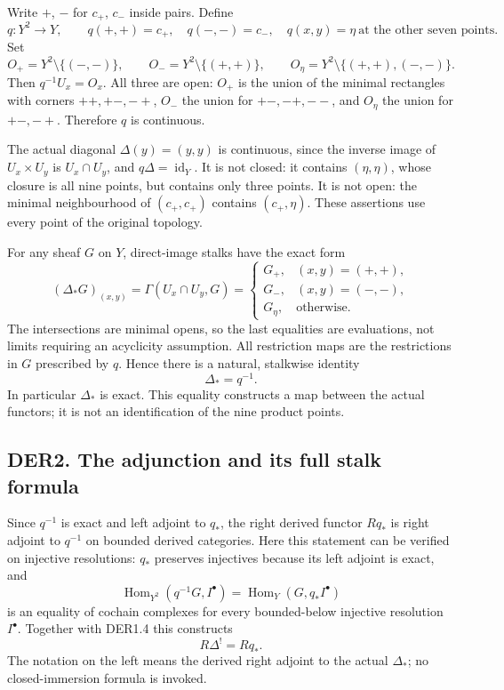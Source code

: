 Write \(+\), \(-\) for \(c_+\), \(c_-\) inside pairs. Define \[
q:Y^2\longrightarrow Y,\qquad
q(+,+)=c_+,\quad q(-,-)=c_-,\quad
q(x,y)=\eta\ \text{at the other seven points}.
\tag{DER1.1}
\] Set \[
O_+=Y^2\setminus\{(-,-)\},\qquad
O_-=Y^2\setminus\{(+,+)\},\qquad
O_\eta=Y^2\setminus\{(+,+),(-,-)\}.
\tag{DER1.2}
\] Then \(q^{-1}U_x=O_x\). All three are open: \(O_+\) is the union of
the minimal rectangles with corners \(++,+-,-+\), \(O_-\) the union for
\(+-,-+,--\), and \(O_\eta\) the union for \(+-,-+\). Therefore \(q\) is
continuous.

The actual diagonal \(\Delta(y)=(y,y)\) is continuous, since the inverse
image of \(U_x\times U_y\) is \(U_x\cap U_y\), and
\(q\Delta=\operatorname{id}_Y\). It is not closed: it contains
\((\eta,\eta)\), whose closure is all nine points, but contains only
three points. It is not open: the minimal neighbourhood of \((c_+,c_+)\)
contains \((c_+,\eta)\). These assertions use every point of the
original topology.

For any sheaf \(G\) on \(Y\), direct-image stalks have the exact form \[
(\Delta_*G)_{(x,y)}
=\Gamma(U_x\cap U_y,G)
=\begin{cases}
G_+,&(x,y)=(+,+),\\
G_-,&(x,y)=(-,-),\\
G_\eta,&\text{otherwise}.
\end{cases}
\tag{DER1.3}
\] The intersections are minimal opens, so the last equalities are
evaluations, not limits requiring an acyclicity assumption. All
restriction maps are the restrictions in \(G\) prescribed by \(q\).
Hence there is a natural, stalkwise identity \[
\boxed{\Delta_*=q^{-1}.}
\tag{DER1.4}
\] In particular \(\Delta_*\) is exact. This equality constructs a map
between the actual functors; it is not an identification of the nine
product points.

\subsection{DER2. The adjunction and its full stalk
formula}\label{der2.-the-adjunction-and-its-full-stalk-formula}

Since \(q^{-1}\) is exact and left adjoint to \(q_*\), the right derived
functor \(Rq_*\) is right adjoint to \(q^{-1}\) on bounded derived
categories. Here this statement can be verified on injective
resolutions: \(q_*\) preserves injectives because its left adjoint is
exact, and \[
\operatorname{Hom}_{Y^2}(q^{-1}G,I^\bullet)
=\operatorname{Hom}_Y(G,q_*I^\bullet)
\] is an equality of cochain complexes for every bounded-below injective
resolution \(I^\bullet\). Together with DER1.4 this constructs \[
\boxed{R\Delta^!=Rq_*.}
\tag{DER2.1}
\] The notation on the left means the derived right adjoint to the
actual \(\Delta_*\); no closed-immersion formula is invoked.

